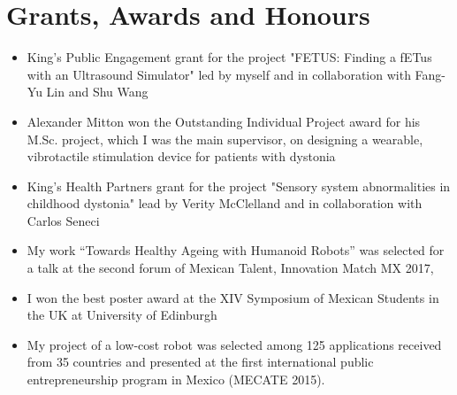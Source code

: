 \documentclass{mycv}
\begin{document}
\section{Grants, Awards and Honours}
\begin{itemize}
\item King's Public Engagement grant for the project "FETUS: Finding a fETus with an Ultrasound Simulator" led by myself and in collaboration with Fang-Yu Lin and Shu Wang \href{https://cai4cai.ml/post/2021-01-07-miguelpegrant/}{\faExternalLink} 

\item Alexander Mitton won the Outstanding Individual Project award for his M.Sc. project, which I was the main supervisor, on designing a wearable, vibrotactile stimulation device for patients with dystonia \href{https://www.kcl.ac.uk/news/mscmres-healthcare-technologies-award-student-prizes-for-outstanding-performance-and-contributions-to-student-life}{\faExternalLink} 

\item King's Health Partners grant for the project "Sensory system abnormalities in childhood dystonia" lead by Verity McClelland and in collaboration with Carlos Seneci \href{https://kclpure.kcl.ac.uk/portal/en/persons/miguel-angel-perez-xochicale(cca72683-31b7-496a-8aeb-181fd9d6a8f3)/projects.html}{\faExternalLink} 

\item My work ``Towards Healthy Ageing with Humanoid Robots'' was selected for a talk at the second forum of Mexican Talent, Innovation Match MX 2017, \href{https://github.com/mxochicale/InnovationMatchMX/tree/master/2017}{\faExternalLink} \href{https://github.com/mxochicale/InnovationMatchMX/blob/master/2017/presentation/IMMX-MA-0058.pdf}{\faFilePdfO} \href{https://www.youtube.com/watch?v=wNWzpdXdm5U}{\faYoutube} 

\item I won the best poster award at the XIV Symposium of Mexican Students in the UK at University of Edinburgh \href{https://github.com/mxochicale/symposiummx/tree/master/2016}{\faExternalLink}  

\item My project of a low-cost robot was selected among 125 applications received from 35 countries and presented at the first international public entrepreneurship program in Mexico (MECATE 2015). \href{http://let-emprendimientopublico.mx/en/portfolio_category/mecate-primera-generacion-en/}{\faExternalLink} \href{https://www.youtube.com/watch?v=VjVGnwD422g}{\faYoutube} 


\end{itemize}
\end{document}
